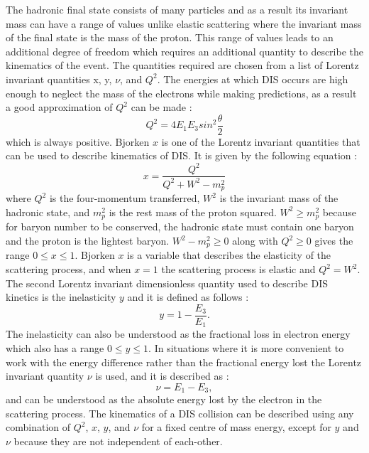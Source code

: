 \documentclass[journal, a4paper,11pt]{IEEEtran}
\begin{document}
The hadronic final state consists of many particles and as a result its invariant mass can have a range of values unlike elastic scattering where the invariant mass of the final state is the mass of the proton. This range of values leads to an additional degree of freedom which requires an additional quantity to describe the kinematics of the event. The quantities required are chosen from a list of Lorentz invariant quantities x, y, $\nu$, and $Q^2$. 
The energies at which DIS occurs are high enough to neglect the mass of the electrons while making predictions, as a result a good approximation of $Q^2$ can be made \cite{Modern}:
\begin{equation}
	Q^2 = 4E_1E_3sin^2\frac{\theta}{2}
	\label{eq:Q2}
\end{equation}
which is always positive.
Bjorken $x$ is one of the Lorentz invariant quantities that can be used to describe kinematics of DIS. It is given by the following equation \cite{Modern}: 
\begin{equation}
	x = \frac{Q^2}{Q^2 + W^2 - m_p^2}
	\label{eq:x}
\end{equation}
where $Q^2$ is the four-momentum transferred, $W^2$ is the invariant mass of the hadronic state, and $m_p^2$ is the rest mass of the proton squared. $W^2 \geq m_p^2$ because for baryon number to be conserved, the hadronic state must contain one baryon and the proton is the lightest baryon. $W^2 - m_p^2 \geq 0$ along with $Q^2 \geq 0$ gives the range $0 \leq x \leq 1$. Bjorken $x$ is a variable that describes the elasticity of the scattering process, and when $x = 1$ the scattering process is elastic and $Q^2 = W^2$.
The second Lorentz invariant dimensionless quantity used to describe DIS kinetics is the inelasticity $y$ and it is defined as follows \cite{Modern}:
\begin{equation}
	y = 1-\frac{E_3}{E_1}.
	\label{eq:y}
\end{equation}
The inelasticity can also be understood as the fractional loss in electron energy which also has a range $0 \leq y \leq 1$.
In situations where it is more convenient to work with the energy difference rather than the fractional energy lost the Lorentz invariant quantity $\nu$ is used, and it is described as \cite{Modern}:
\begin{equation}
	\nu = E_1 - E_3,
	\label{eq:nu}
\end{equation}
and can be understood as the absolute energy lost by the electron in the scattering process.
The kinematics of a DIS collision can be described using any combination of $Q^2$, $x$, $y$, and $\nu$ for a fixed centre of mass energy, except for $y$ and $\nu$ because they are not independent of each-other.
\end{document}
